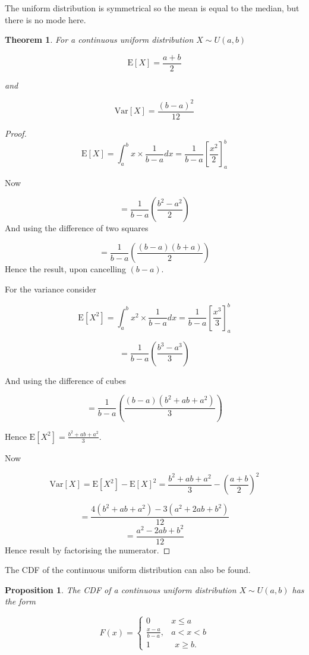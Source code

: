 \documentclass[
]{book}
\newtheorem{theorem}{Theorem}[chapter]
\newtheorem{proposition}{Proposition}[chapter]
\theoremstyle{definition}
\theoremstyle{definition}
\theoremstyle{definition}
\theoremstyle{definition}
\theoremstyle{remark}
\begin{document}
The uniform distribution is symmetrical so the mean is equal to the median, but there is no mode here.

\begin{theorem}
For a continuous uniform distribution \(X\sim U(a,b)\)

\[\text{E}[X] = \frac{a+b}{2}\]

and

\[\text{Var}[X]= \frac{(b-a)^2}{12}\]
\end{theorem}

\begin{proof}
\[\text{E}[X] = \int_a^b x \times \frac{1}{b-a} dx  =\frac{1}{b-a} \left[ \frac{x^2}{2} \right]^{b}_{a}\]

Now

\[= \frac{1}{b-a} \left( \frac{b^2-a^2}{2} \right)\]
And using the difference of two squares

\[= \frac{1}{b-a} \left( \frac{(b-a)(b+a)}{2} \right)\]
Hence the result, upon cancelling \((b-a)\).

For the variance consider

\[\text{E}[X^2] = \int_a^b x^2 \times \frac{1}{b-a} dx  =\frac{1}{b-a} \left[ \frac{x^3}{3} \right]^{b}_{a}\]

\[= \frac{1}{b-a} \left( \frac{b^3-a^3}{3} \right)\]

And using the difference of cubes

\[= \frac{1}{b-a} \left( \frac{(b-a)(b^2+ab+a^2)}{3} \right)\]

Hence \(\text{E}[X^2] = \frac{b^2+ab+a^2}{3}\).

Now

\[\text{Var}[X] = \text{E}[X^2] - \text{E}[X]^2 = \frac{b^2+ab+a^2}{3} - \left(\frac{a+b}{2} \right)^2\]

\[ = \frac{4(b^2+ab+a^2)- 3(a^2 + 2ab +b^2)}{12}\]
\[= \frac{a^2-2ab +b^2}{12}\]
Hence result by factorising the numerator.
\end{proof}

The CDF of the continuous uniform distribution can also be found.

\begin{proposition}
The CDF of a continuous uniform distribution \(X\sim U(a,b)\) has the form

\begin{equation*}
  F(x)=\begin{cases}
        0 & x \leq a \\
    \frac{x-a}{b-a}, &  a< x < b\\
    1 & \ \ x \geq b.
  \end{cases}
\end{equation*}
\end{proposition}
\end{document}
